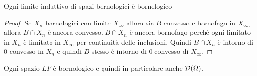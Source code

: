 \begin{fact}
    Ogni limite induttivo di spazi bornologici \`e bornologico
\end{fact}
\begin{proof}
Se $X_n$ bornologici con limite $X_\infty$ allora sia $B$ convesso e bornofago in $X_\infty$, allora $B\cap X_n$ \`e ancora convesso. $B\cap X_n$ \`e ancora bornofago perch\'e ogni limitato in $X_n$ \`e limitato in $X_\infty$ per continuit\`a delle inclusioni. Quindi $B\cap X_n$ \`e intorno di $0$ convesso in $X_n$ e quindi $B$ stesso \`e intorno di $0$ convesso di $X_\infty$.
\end{proof}
\begin{corollary}
    Ogni spazio $LF$ \`e bornologico e quindi in particolare anche $\mathcal{D}(\Omega)$.
\end{corollary}
